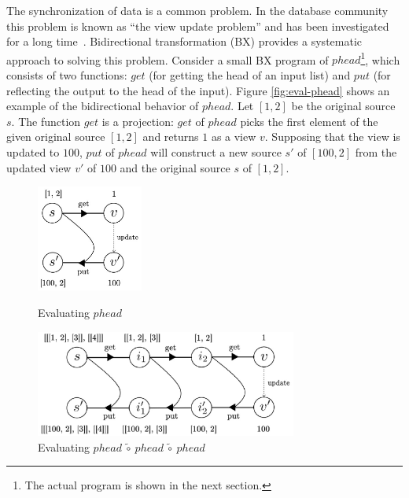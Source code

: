 The synchronization of data is a common problem. In the database community this problem is known as ``the view update problem'' and has been investigated for a long time~\cite{Bancilhon:1981:USR:319628.319634}. Bidirectional transformation (BX) provides a systematic approach to solving this problem.
Consider a small BX program of $phead$\footnote{The actual program is shown in the next section.}, which consists of two functions: $get$ (for getting the head of an input list) and $put$ (for reflecting the output to the head of the input). Figure \ref{fig:eval-phead} shows an example of the bidirectional behavior of $phead$.
Let $[1,2]$ be the original source~$s$.
The function $get$ is a projection: $get$ of $phead$ picks the first element of the given original source $[1,2]$ and returns $1$ as a view $v$.
Supposing that the view is updated to $100$,
$put$ of $phead$ will construct a new source $s'$ of ${[100,2]}$ from the updated view $v'$ of $100$ and the original source $s$ of $[1,2]$.

\begin{figure}[!t]
  \begin{minipage}{0.3\textwidth}
    \centering
    \includegraphics[height=3.5cm]{./fig/fig1.eps}
    \caption{Evaluating $phead$}
    \label{fig:eval-phead}
  \end{minipage}\hfill
  \begin{minipage}{0.7\textwidth}
    \centering
    \includegraphics[height=3.5cm]{./fig/fig2.eps}
    \caption{Evaluating $phead~\tilde{\circ}~phead~\tilde{\circ}~phead$}
    \label{fig:eval-comp-phead}
  \end{minipage}
\end{figure}


